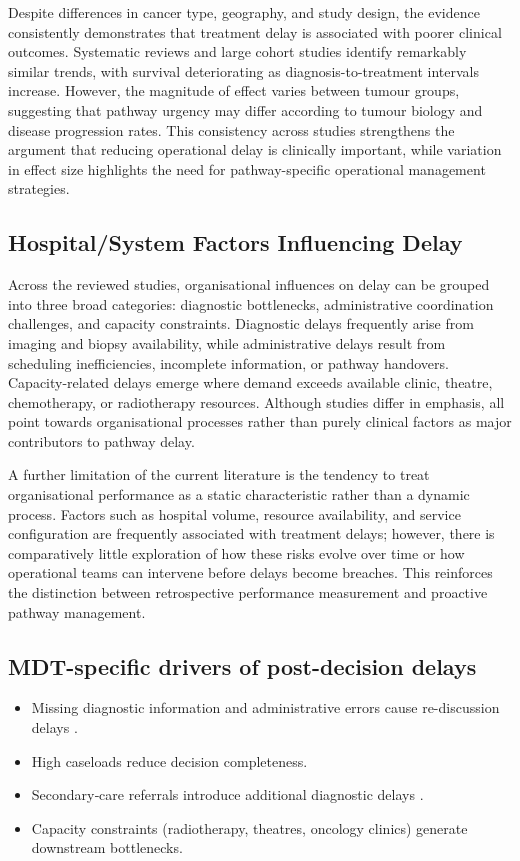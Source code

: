 Despite differences in cancer type, geography, and study design, the evidence consistently demonstrates that treatment delay is associated with poorer clinical outcomes. Systematic reviews and large cohort studies identify remarkably similar trends, with survival deteriorating as diagnosis-to-treatment intervals increase. However, the magnitude of effect varies between tumour groups, suggesting that pathway urgency may differ according to tumour biology and disease progression rates. This consistency across studies strengthens the argument that reducing operational delay is clinically important, while variation in effect size highlights the need for pathway-specific operational management strategies.

\subsection{Hospital/System Factors Influencing Delay}

Across the reviewed studies, organisational influences on delay can be grouped into three broad categories: diagnostic bottlenecks, administrative coordination challenges, and capacity constraints. Diagnostic delays frequently arise from imaging and biopsy availability, while administrative delays result from scheduling inefficiencies, incomplete information, or pathway handovers. Capacity-related delays emerge where demand exceeds available clinic, theatre, chemotherapy, or radiotherapy resources. Although studies differ in emphasis, all point towards organisational processes rather than purely clinical factors as major contributors to pathway delay.

A further limitation of the current literature is the tendency to treat organisational performance as a static characteristic rather than a dynamic process. Factors such as hospital volume, resource availability, and service configuration are frequently associated with treatment delays; however, there is comparatively little exploration of how these risks evolve over time or how operational teams can intervene before delays become breaches. This reinforces the distinction between retrospective performance measurement and proactive pathway management.

\subsection{MDT-specific drivers of post-decision delays}

\begin{itemize}
    \item Missing diagnostic information and administrative errors cause re-discussion delays \citep{soukup2022}.
    \item High caseloads reduce decision completeness.
    \item Secondary‑care referrals introduce additional diagnostic delays \citep{chakravarty2023}.
    \item Capacity constraints (radiotherapy, theatres, oncology clinics) generate downstream bottlenecks.
\end{itemize}

